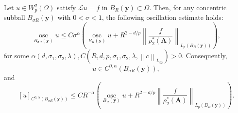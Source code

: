 \documentclass[final,onefignum,onetabnum]{mousaviart}
\begin{document}
	\begin{lemma}
		\label{lem:interior-Holder-continuity}
		Let $u \in W^2_p(\Omega)$ satisfy $\mathcal{L}u = f$ in $B_R(\boldsymbol{y}) \subset \Omega$. Then, for any concentric subball $B_{\sigma R}(\boldsymbol{y})$ with $0 < \sigma < 1$, the following oscillation estimate holds:
		\begin{equation}
			\label{ineq:oscillation-bound}
			\operatorname*{osc}_{B_{\sigma R}(\boldsymbol{y})} u
			\le
			C \sigma^{\alpha}
			\left(
			\operatorname*{osc}_{B_R(\boldsymbol{y})} u
			+
			R^{2-d/p}
			\left\|
			\frac{f}{\rho_2^{\ast}(\boldsymbol{A})}
			\right\|_{L_p(B_R(\boldsymbol{y}))}
			\right),
		\end{equation}
		for some $\alpha(d, \sigma_1, \sigma_2, \lambda), C(R,d, p, \sigma_1, \sigma_2, \lambda, \left\| c\right\|_{L_{\infty}} ) > 0$.
		Consequently,
		\[
		u \in C^{0,\alpha}(B_{\sigma R}(\boldsymbol{y})),
		\]
		and
		\begin{equation}
			\label{ineq:interior-Holder-continuity}
			[u]_{C^{0,\alpha}(B_{\sigma R}(\boldsymbol{y}))}
			\le
			C R^{-\alpha}
			\left(
			\operatorname*{osc}_{B_R(\boldsymbol{y})} u
			+
			R^{2-d/p}
			\left\|
			\frac{f}{\rho_2^{\ast}(\boldsymbol{A})}
			\right\|_{L_p(B_R(\boldsymbol{y}))}
			\right).
		\end{equation}
	\end{lemma}
\end{document}
